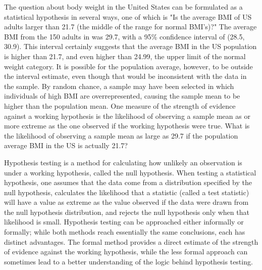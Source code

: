 \begin{spacing}{1.5}
The question about body weight in the United States can be formulated as a statistical hypothesis in several ways, one of which is  "Is the average BMI of US adults larger than 21.7 (the middle of the range for normal BMI's)?" The average BMI from the 150 adults in  was 29.7, with a 95\% confidence interval of (28.5, 30.9). This interval certainly suggests that the average BMI in the US population is higher than 21.7, and even higher than 24.99, the upper limit of the normal weight category.  It is possible for the population average, however, to be outside the interval estimate, even though that would be inconsistent with the data in the sample. By random chance, a sample may have been selected in which individuals of high BMI are overrepresented, causing the sample mean to be higher than the population mean. One measure of the strength of evidence against a working hypothesis is the likelihood of observing a sample mean as or more extreme as the one observed if the working hypothesis were true. What is the likelihood of observing a sample mean as large as 29.7 if the population average BMI in the US is actually 21.7?

Hypothesis testing is a method for calculating how unlikely an observation is under a working hypothesis, called the null hypothesis.  When testing a statistical hypothesis, one assumes that the data come from a distribution specified by the null hypothesis, calculates the likelihood that a statistic (called a test statistic) will have a value as extreme as the value observed if the data were drawn from the null hypothesis distribution, and rejects the null hypothesis only when that likelihood is small.  Hypothesis testing can be approached either informally or formally; while both methods reach essentially  the same conclusions, each has distinct advantages. The formal method provides a direct estimate of the strength of evidence against the working hypothesis, while the less formal approach can sometimes lead to a better understanding of the logic behind hypothesis testing.


\end{spacing}
